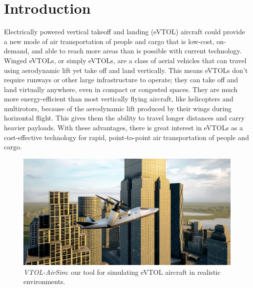 


\chapter{Introduction}\label{chp:intro}

Electrically powered vertical takeoff and landing (eVTOL) aircraft could provide a new mode of air transportation of people and cargo that is low-cost, on-demand, and able to reach more areas than is possible with current technology. Winged eVTOLs, or simply eVTOLs, are a class of aerial vehicles that can travel using aerodynamic lift yet take off and land vertically. This means eVTOLs don't require runways or other large infrastructure to operate; they can take off and land virtually anywhere, even in compact or congested spaces. They are much more energy-efficient than most vertically flying aircraft, like helicopters and multirotors, because of the aerodynamic lift produced by their wings during horizontal flight. This gives them the ability to travel longer distances and carry heavier payloads. With these advantages, there is great interest in eVTOLs as a cost-effective technology for rapid, point-to-point air transportation of people and cargo.

\begin{figure}[h]
    \centering
    \includegraphics[width=\textwidth]{figures/vtol_airsim_cityblocks_crop3}
    \caption[Tiltrotor vehicle in CityBlocks environment]{
        \textit{VTOL-AirSim}: our tool for simulating eVTOL aircraft in realistic environments.}%
    \label{fig:vtol_airsim_cityblocks}
\end{figure}


